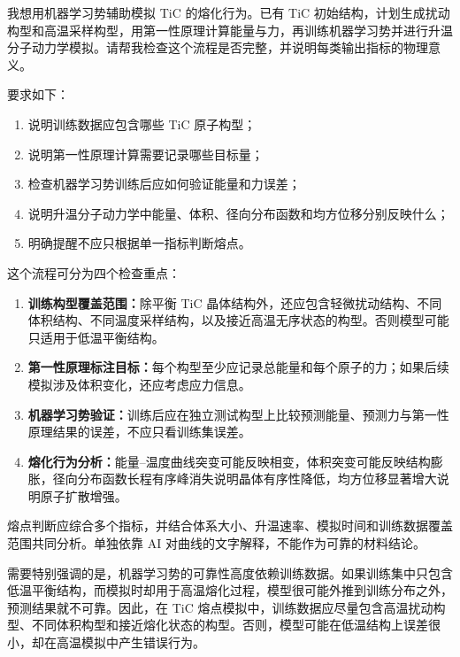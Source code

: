 \begin{samepage}
\begin{userbox}
我想用机器学习势辅助模拟 TiC 的熔化行为。已有 TiC 初始结构，计划生成扰动构型和高温采样构型，用第一性原理计算能量与力，再训练机器学习势并进行升温分子动力学模拟。请帮我检查这个流程是否完整，并说明每类输出指标的物理意义。

要求如下：
\begin{enumerate}
\item 说明训练数据应包含哪些 TiC 原子构型；
\item 说明第一性原理计算需要记录哪些目标量；
\item 检查机器学习势训练后应如何验证能量和力误差；
\item 说明升温分子动力学中能量、体积、径向分布函数和均方位移分别反映什么；
\item 明确提醒不应只根据单一指标判断熔点。
\end{enumerate}
\end{userbox}

\begin{aibox}
这个流程可分为四个检查重点：

\begin{enumerate}
\item \textbf{训练构型覆盖范围：}除平衡 TiC 晶体结构外，还应包含轻微扰动结构、不同体积结构、不同温度采样结构，以及接近高温无序状态的构型。否则模型可能只适用于低温平衡结构。
\item \textbf{第一性原理标注目标：}每个构型至少应记录总能量和每个原子的力；如果后续模拟涉及体积变化，还应考虑应力信息。
\item \textbf{机器学习势验证：}训练后应在独立测试构型上比较预测能量、预测力与第一性原理结果的误差，不应只看训练集误差。
\item \textbf{熔化行为分析：}能量--温度曲线突变可能反映相变，体积突变可能反映结构膨胀，径向分布函数长程有序峰消失说明晶体有序性降低，均方位移显著增大说明原子扩散增强。
\end{enumerate}

熔点判断应综合多个指标，并结合体系大小、升温速率、模拟时间和训练数据覆盖范围共同分析。单独依靠 AI 对曲线的文字解释，不能作为可靠的材料结论。
\end{aibox}
\end{samepage}

需要特别强调的是，机器学习势的可靠性高度依赖训练数据。如果训练集中只包含低温平衡结构，而模拟时却用于高温熔化过程，模型很可能外推到训练分布之外，预测结果就不可靠。因此，在 TiC 熔点模拟中，训练数据应尽量包含高温扰动构型、不同体积构型和接近熔化状态的构型。否则，模型可能在低温结构上误差很小，却在高温模拟中产生错误行为。



